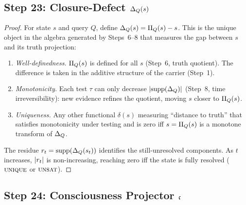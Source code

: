 \subsection{Step 23: Closure-Defect $\Delta_{Q}(s)$}\label{app:step23-new}

\begin{proof}
For state $s$ and query $Q$, define $\Delta_{Q}(s) = \Pi_Q(s) - s$.
This is the unique object in the algebra generated by Steps~6--8 that
measures the gap between $s$ and its truth projection:

\begin{enumerate}[nosep]
  \item \emph{Well-definedness.} $\Pi_Q(s)$ is defined for all $s$ (Step~6,
        truth quotient).  The difference is taken in the additive structure
        of the carrier (Step~1).

  \item \emph{Monotonicity.} Each test $\tau$ can only decrease
        $|\mathrm{supp}(\Delta_{Q})|$ (Step~8, time irreversibility):
        new evidence refines the quotient, moving $s$ closer to $\Pi_Q(s)$.

  \item \emph{Uniqueness.} Any other functional $\delta(s)$ measuring
        ``distance to truth'' that satisfies monotonicity under testing and
        is zero iff $s = \Pi_Q(s)$ is a monotone transform of
        $\Delta_{Q}$.
\end{enumerate}

The residue $r_t = \mathrm{supp}(\Delta_{Q}(s_t))$ identifies
the still-unresolved components.  As $t$ increases, $|r_t|$ is
non-increasing, reaching zero iff the state is fully resolved ($\textsc{unique}$
or $\textsc{unsat}$).

\end{proof}


\subsection{Step 24: Consciousness Projector $\mathfrak{c}$}\label{app:step24-new}

